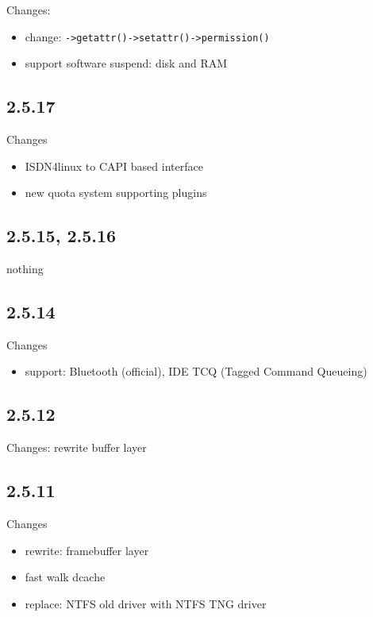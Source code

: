 Changes: 
\begin{itemize}
  \item change: \verb!->getattr()->setattr()->permission()!
  \item support software suspend: disk and RAM  
\end{itemize}

\subsection{2.5.17}

Changes
\begin{itemize}
  \item ISDN4linux to CAPI based interface
  \item new quota system supporting plugins
\end{itemize}

\subsection{2.5.15, 2.5.16}

nothing 

\subsection{2.5.14}

Changes
\begin{itemize}
  \item support: Bluetooth (official), IDE TCQ (Tagged Command Queueing)
\end{itemize}

\subsection{2.5.12}

Changes: rewrite buffer layer	

\subsection{2.5.11}

Changes
\begin{itemize}
  \item rewrite: framebuffer layer
  
  \item fast walk dcache
  
  \item replace: NTFS old driver with NTFS TNG driver
\end{itemize}


